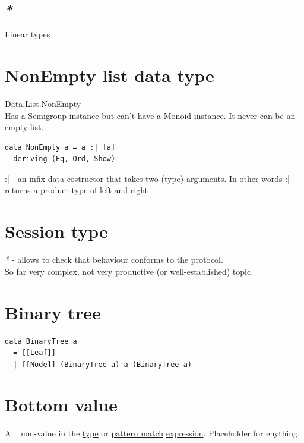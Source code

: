 \documentclass[a4paper,14pt,oneside]{book}
\begin{document}
\subsection{\emph{*}}
\label{sec:org9278c93}

\label{org0bc2a06}Linear types\\

\section{\label{org5b6a888}NonEmpty list data type}
\label{sec:org1c59b1f}
Data.\hyperref[org4979b23]{List}.NonEmpty\\
Has a \hyperref[orgea3c73f]{Semigroup} instance but can't have a \hyperref[orgd7ec4ef]{Monoid} instance. It never can be an empty \hyperref[org4979b23]{list}.\\

\begin{verbatim}
data NonEmpty a = a :| [a]
  deriving (Eq, Ord, Show)
\end{verbatim}

:| - an \hyperref[orga1cd77d]{infix} data costructor that takes two (\hyperref[org35b9249]{type}) arguments. In other words :| returns a \hyperref[orgd84b504]{product type} of left and right\\

\section{\label{org3f2da53}Session type}
\label{sec:orgf4fa83b}
\emph{*} - allows to check that behaviour conforms to the protocol.\\

So far very complex, not very productive (or well-established) topic.\\

\section{\label{orge61bb62}Binary tree}
\label{sec:org52d9fce}
\begin{verbatim}
data BinaryTree a
  = [[Leaf]]
  | [[Node]] (BinaryTree a) a (BinaryTree a)
\end{verbatim}

\section{\label{orge3ac4ca}Bottom value}
\label{sec:org5e75fc6}
A \texttt{\_} non-value in the \hyperref[org35b9249]{type} or \hyperref[org4b06001]{pattern match} \hyperref[orgade06d7]{expression}. Placeholder for enything.\\
\end{document}
